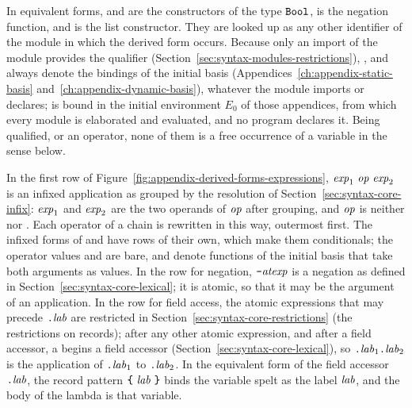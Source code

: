 In equivalent forms,  and  are the
constructors of the type $\mathtt{Bool}$,  is the negation
function, and \kw{::} is the list constructor. They are looked up as any
other identifier of the module in which the derived form occurs. Because
only an import of the module  provides the qualifier 
(Section~\ref{sec:syntax-modules-restrictions}), ,
 and  always denote the bindings of the
initial basis (Appendices~\ref{ch:appendix-static-basis}
and~\ref{ch:appendix-dynamic-basis}), whatever the module imports or
declares; \kw{::} is bound in the initial environment $E_0$ of those
appendices, from which every module is elaborated and evaluated, and no
program declares it. Being qualified, or an operator, none of them is a free
occurrence of a variable in the sense below.

In the first row of Figure~\ref{fig:appendix-derived-forms-expressions},
$\mathit{exp}_1\ \mathit{op}\ \mathit{exp}_2$ is an infixed application as grouped by the
resolution of Section~\ref{sec:syntax-core-infix}: $\mathit{exp}_1$ and $\mathit{exp}_2$
are the two operands of $\mathit{op}$ after grouping, and $\mathit{op}$ is neither \kw{\&\&}
nor \kw{||}. Each operator of a chain is rewritten in this way, outermost
first. The infixed forms of \kw{\&\&} and \kw{||} have rows of their own, which
make them conditionals; the operator values \kw{(\&\&)} and \kw{(||)} are
bare, and denote functions of the initial basis that take both arguments as
values. %
In the row for negation, $\textnormal{\texttt{-}}\mathit{atexp}$ is a negation as defined in
Section~\ref{sec:syntax-core-lexical}; it is atomic, so that it may be the
argument of an application. %
In the row for field access, the atomic expressions that may precede
$\textnormal{\texttt{.}}\mathit{lab}$ are restricted in Section~\ref{sec:syntax-core-restrictions}
(the restrictions on records); after any other atomic expression, and after a
field accessor, a  begins a field accessor
(Section~\ref{sec:syntax-core-lexical}), so $\textnormal{\texttt{.}}\mathit{lab}_1\textnormal{\texttt{.}}\mathit{lab}_2$ is the
application of $\textnormal{\texttt{.}}\mathit{lab}_1$ to $\textnormal{\texttt{.}}\mathit{lab}_2$.
In the equivalent form of the field accessor $\textnormal{\texttt{.}}\mathit{lab}$, the record pattern
$\kw{\kwlb}\ \lab\ \kw{\kwrb}$ binds the variable spelt as the label $\mathit{lab}$,
and the body of the lambda is that variable. %


